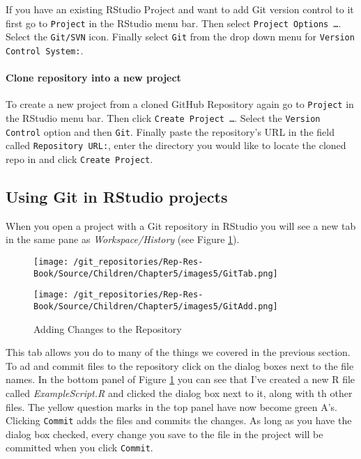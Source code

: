 If you have an existing RStudio Project and want to add Git version control to it first go to \texttt{Project} in the RStudio menu bar. Then select \texttt{Project Options \ldots}. Select the \texttt{Git/SVN} icon. Finally select \texttt{Git} from the drop down menu for \texttt{Version Control System:}.

\paragraph{Clone repository into a new project}

To create a new project from a cloned GitHub Repository again go to \texttt{Project} in the RStudio menu bar. Then click \texttt{Create Project \ldots}. Select the \texttt{Version Control} option and then \texttt{Git}. Finally paste the repository's URL in the field called \texttt{Repository URL:}, enter the directory you would like to locate the cloned repo in and click \texttt{Create Project}. 

\subsection{Using Git in RStudio projects}

When you open a project with a Git repository in RStudio you will see a new tab in the same pane as \emph{Workspace/History} (see Figure \ref{GitTab}).

\begin{figure}
    \caption{The RStudio Git Tab}
    \label{GitTab}
    \begin{center}

    \begin{subfigure}
        \caption{ExampleProject Git Tab}
            \texttt{[image: /git\_repositories/Rep-Res-Book/Source/Children/Chapter5/images5/GitTab.png]}
    \end{subfigure}
    \vspace{0.25cm}

    \begin{subfigure}
        \caption{Adding Changes to the Repository}
            \texttt{[image: /git\_repositories/Rep-Res-Book/Source/Children/Chapter5/images5/GitAdd.png]}
    \end{subfigure}
    \end{center}
\end{figure}

This tab allows you do to many of the things we covered in the previous section. To ad and commit files to the repository click on the dialog boxes next to the file names. In the bottom panel of Figure \ref{GitTab} you can see that I've created a new R file called \emph{ExampleScript.R} and clicked the dialog box next to it, along with th other files. The yellow question marks in the top panel have now become green A's. Clicking \texttt{Commit} adds the files and commits the changes. As long as you have the dialog box checked, every change you save to the file in the project will be committed when you click \texttt{Commit}. 

